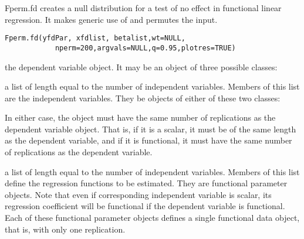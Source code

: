 \documentclass{article}
\begin{document}
\begin{Description}\relax
Fperm.fd creates a null distribution for a test of no effect in functional
linear regression. It makes generic use of  and permutes the
 input.
\end{Description}
\begin{Usage}
\begin{verbatim}
Fperm.fd(yfdPar, xfdlist, betalist,wt=NULL,
            nperm=200,argvals=NULL,q=0.95,plotres=TRUE)
\end{verbatim}
\end{Usage}
\begin{Arguments}
\begin{ldescription}
\item[\code{yfdPar}] the dependent variable object.  It may be an object of
three possible classes:

\item[\code{xfdlist}] a list of length equal to the number of independent variables. Members
of this list are the independent variables.  They be objects of either
of these two classes:


In either case, the object must have the same number of replications as
the dependent variable object.  That is, if it is a scalar, it must be
of the same length as the dependent variable, and if it is functional,
it must have the same number of replications as the dependent variable.

\item[\code{betalist}] a list of length equal to the number of independent variables. Members
of this list define the regression functions to be estimated.
They are functional parameter objects.  Note that even if corresponding
independent variable is scalar, its regression coefficient will be
functional if the dependent variable is functional.  Each of these
functional parameter objects defines a single functional data object,
that is, with only one replication.


\end{ldescription}
\end{Arguments}
\end{document}
